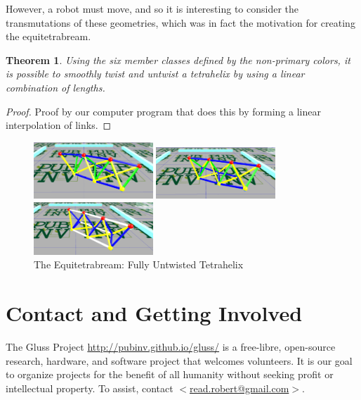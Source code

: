 \documentclass[11pt]{article}
\newtheorem{theorem}{Theorem}
\begin{document}
However, a robot must move, and so it is interesting to consider the transmutations of these geometries, which was in
fact the motivation for creating the equitetrabream.

\begin{theorem}

  Using the six member classes defined by the non-primary colors, it is possible to smoothly twist and untwist a tetrahelix by
  using a linear combination of lengths.
  
\end{theorem}

\begin{proof}
  Proof by our computer program that does this by forming a linear interpolation of links.
\end{proof}

\begin{figure}[H] %
  \centering
     \includegraphics[width=0.4\textwidth]{figures/Tetrahelix1.png}
     \caption{2/3rd Twisted Tetrahelix}
     \includegraphics[width=0.4\textwidth]{figures/Tetrahelix2.png}
     \caption{1/3rd Twisted, 2/3rd Untwisted Tetrahelix}
     \includegraphics[width=0.4\textwidth]{figures/Tetrahelix3.png}
     \caption{The Equitetrabream: Fully Untwisted Tetrahelix}
\end{figure}

\section{Contact and Getting Involved}

The Gluss Project \url{http://pubinv.github.io/gluss/}
is a free-libre, open-source research, hardware, and software project that welcomes volunteers.
It is our goal to organize projects for the benefit of all humanity without seeking profit or intellectual property.
To assist, contact \href{mailto:read.robert@gmail.com}{$<$read.robert@gmail.com$>$}.



\end{document}
